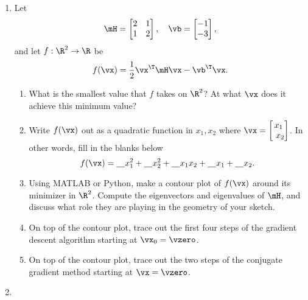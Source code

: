\documentclass[11pt]{article}
\begin{document}
\begin{enumerate}
\vspace{4mm} 
\item Let
\[
	\mH = \begin{bmatrix} 2 & 1 \\ 1 & 2 \end{bmatrix},
	\quad
	\vb = \begin{bmatrix} -1 \\ -3 \end{bmatrix},
\]
and let $f:\R^2\rightarrow\R$ be
\[
	f(\vx) = \frac{1}{2}\vx^\T\mH\vx - \vb^\T\vx.
\]	
\begin{enumerate}
	\item What is the smallest value that $f$ takes on $\R^2$?  At what $\vx$ does it achieve this minimum value?
	
	\item Write $f(\vx)$ out as a quadratic function in $x_1,x_2$ where $\vx = \begin{bmatrix} x_1 \\\ x_2 \end{bmatrix}$.  In other words, fill in the blanks below
	\[
		f(\vx) = \underline{\quad}x_1^2 + \underline{\quad}x_2^2 + \underline{\quad}x_1x_2 + \underline{\quad}x_1 + \underline{\quad}x_2.
	\]
	
	\item Using MATLAB or Python, make a contour plot of $f(\vx)$ around its minimizer in $\R^2$.  Compute the eigenvectors and eigenvalues of $\mH$, and discuss what role they are playing in the geometry of your sketch.
	
	\item On top of the contour plot, trace out the first four steps of the gradient descent algorithm starting at $\vx_0 =\vzero$.
	
	\item On top of the contour plot, trace out the two steps of the conjugate gradient method starting at $\vx=\vzero$.
\end{enumerate}

\vspace{4mm}
\item 
\begin{enumerate}


\end{enumerate}
\end{enumerate}
\end{document}

